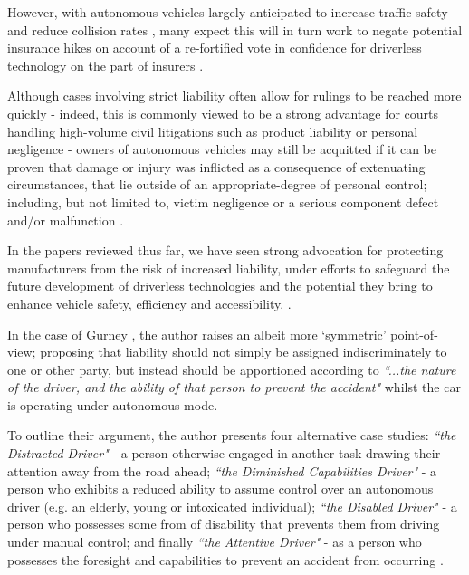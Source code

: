 \documentclass[conference]{IEEEtran}
\begin{document}
However, with autonomous vehicles largely anticipated to increase traffic safety and reduce collision rates \cite{duffy, marchant, schellekens}, many expect this will in turn work to negate potential insurance hikes on account of a re-fortified vote in confidence for driverless technology on the part of insurers \cite{duffy, marchant}. 

Although cases involving strict liability often allow for rulings to be reached more quickly - indeed, this is commonly viewed to be a strong advantage for courts handling high-volume civil litigations such as product liability or personal negligence \cite{duffy} - owners of autonomous vehicles may still be acquitted if it can be proven that damage or injury was inflicted as a consequence of extenuating circumstances, that lie outside of an appropriate-degree of personal control; including, but not limited to, victim negligence or a serious component defect and/or malfunction \cite{duffy}.

In the papers reviewed thus far, we have seen strong advocation for protecting manufacturers from the risk of increased liability, under efforts to safeguard the future development of driverless technologies and the potential they bring to enhance vehicle safety, efficiency and accessibility. \cite{beiker, schellekens, marchant}. 

In the case of Gurney \cite{gurney}, the author raises an albeit more `symmetric' point-of-view; proposing that liability should not simply be assigned indiscriminately to one or other party, but instead should be apportioned according to \textit{``...the nature of the driver, and the ability of that person to prevent the accident"} whilst the car is operating under autonomous mode. 

To outline their argument, the author presents four alternative case studies: \textit{``the Distracted Driver"} - a person otherwise engaged in another task drawing their attention away from the road ahead; \textit{``the Diminished Capabilities Driver"} - a person who exhibits a reduced ability to assume control over an autonomous driver (e.g. an elderly, young or intoxicated individual); \textit{``the Disabled Driver"} - a person who possesses some from of disability that prevents them from driving under manual control; and finally \textit{``the Attentive Driver"} - as a person who possesses the foresight and capabilities to prevent an accident from occurring \cite{gurney}. 
\end{document}
